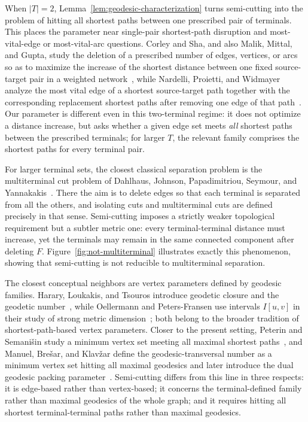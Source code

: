 \documentclass[11pt,a4paper]{amsart}
\theoremstyle{definition}
\theoremstyle{plain}
\begin{document}
When $|T|=2$, Lemma~\ref{lem:geodesic-characterization} turns semi-cutting into the problem of hitting all shortest paths between one prescribed pair of terminals. This places the parameter near single-pair shortest-path disruption and most-vital-edge or most-vital-arc questions. Corley and Sha, and also Malik, Mittal, and Gupta, study the deletion of a prescribed number of edges, vertices, or arcs so as to maximize the increase of the shortest distance between one fixed source-target pair in a weighted network~\cite{corley-sha,malik-mittal-gupta}, while Nardelli, Proietti, and Widmayer analyze the most vital edge of a shortest source-target path together with the corresponding replacement shortest paths after removing one edge of that path~\cite{nardelli-proietti-widmayer}. Our parameter is different even in this two-terminal regime: it does not optimize a distance increase, but asks whether a given edge set meets \emph{all} shortest paths between the prescribed terminals; for larger $T$, the relevant family comprises the shortest paths for every terminal pair.

For larger terminal sets, the closest classical separation problem is the multiterminal cut problem of Dahlhaus, Johnson, Papadimitriou, Seymour, and Yannakakis~\cite{dahlhaus1994}. There the aim is to delete edges so that each terminal is separated from all the others, and isolating cuts and multiterminal cuts are defined precisely in that sense. Semi-cutting imposes a strictly weaker topological requirement but a subtler metric one: every terminal-terminal distance must increase, yet the terminals may remain in the same connected component after deleting $F$. Figure~\ref{fig:not-multiterminal} illustrates exactly this phenomenon, showing that semi-cutting is not reducible to multiterminal separation.

The closest conceptual neighbors are vertex parameters defined by geodesic families. Harary, Loukakis, and Tsouros introduce geodetic closure and the geodetic number~\cite{harary-loukakis-tsouros}, while Oellermann and Peters-Fransen use intervals $I[u,v]$ in their study of strong metric dimension~\cite{oellermann-peters-fransen}; both belong to the broader tradition of shortest-path-based vertex parameters. Closer to the present setting, Peterin and Semani\v{s}in study a minimum vertex set meeting all maximal shortest paths~\cite{peterin-semanisin}, and Manuel, Bre\v{s}ar, and Klav\v{z}ar define the geodesic-transversal number as a minimum vertex set hitting all maximal geodesics and later introduce the dual geodesic packing parameter~\cite{manuel-bresar-klavzar-transversal,manuel-bresar-klavzar-packing}. Semi-cutting differs from this line in three respects: it is edge-based rather than vertex-based; it concerns the terminal-defined family rather than maximal geodesics of the whole graph; and it requires hitting all shortest terminal-terminal paths rather than maximal geodesics.
\end{document}
